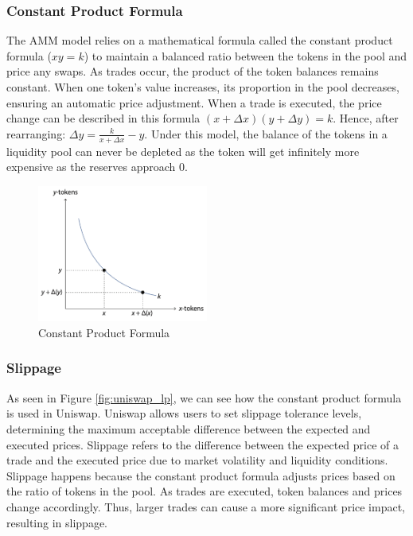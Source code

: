 \subsubsection{Constant Product Formula}

The AMM model relies on a mathematical formula called the constant product formula ($xy = k$) to maintain a balanced ratio between the tokens in the pool and price any swaps. As trades occur, the product of the token balances remains constant. When one token's value increases, its proportion in the pool decreases, ensuring an automatic price adjustment. When a trade is executed, the price change can be described in this formula $(x + \Delta x)(y + \Delta y) = k$. Hence, after rearranging: $\Delta y = \frac{k}{x + \Delta x} - y$. Under this model, the balance of the tokens in a liquidity pool can never be depleted as the token will get infinitely more expensive as the reserves approach 0.

\begin{figure}[!htb]
    \centering
    \includegraphics[width=0.5\textwidth]{background/Images/constant_product_formula.png}
    \caption{Constant Product Formula~\cite{schar2021decentralized}}
\end{figure}

\subsubsection{Slippage}

As seen in Figure \ref{fig:uniswap_lp}, we can see how the constant product formula is used in Uniswap. Uniswap allows users to set slippage tolerance levels, determining the maximum acceptable difference between the expected and executed prices. Slippage refers to the difference between the expected price of a trade and the executed price due to market volatility and liquidity conditions. Slippage happens because the constant product formula adjusts prices based on the ratio of tokens in the pool. As trades are executed, token balances and prices change accordingly. Thus, larger trades can cause a more significant price impact, resulting in slippage.

